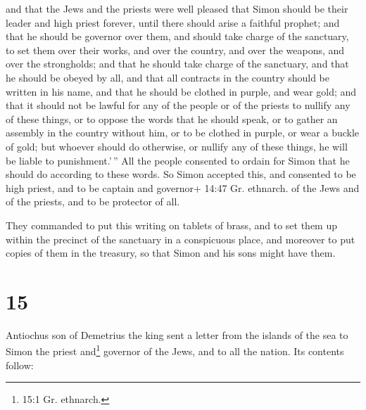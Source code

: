  and that the Jews and the priests were well pleased that
Simon should be their leader and high priest forever, until there should
arise a faithful prophet;  and that he should be governor
over them, and should take charge of the sanctuary, to set them over
their works, and over the country, and over the weapons, and over the
strongholds; and that he should take charge of the sanctuary,
 and that he should be obeyed by all, and that all
contracts in the country should be written in his name, and that he
should be clothed in purple, and wear gold;  and that it
should not be lawful for any of the people or of the priests to nullify
any of these things, or to oppose the words that he should speak, or to
gather an assembly in the country without him, or to be clothed in
purple, or wear a buckle of gold;  but whoever should do
otherwise, or nullify any of these things, he will be liable to
punishment.'\,''  All the people consented to ordain for
Simon that he should do according to these words.  So Simon
accepted this, and consented to be high priest, and to be captain and
governor+ 14:47 Gr. ethnarch. of the Jews and of the priests, and to be
protector of all.

 They commanded to put this writing on tablets of brass,
and to set them up within the precinct of the sanctuary in a conspicuous
place,  and moreover to put copies of them in the treasury,
so that Simon and his sons might have them.

\hypertarget{section-14}{%
\section{15}\label{section-14}}

 Antiochus son of Demetrius the king sent a letter from the
islands of the sea to Simon the priest and\footnote{15:1 Gr. ethnarch.}
governor of the Jews, and to all the nation.  Its contents
follow:

